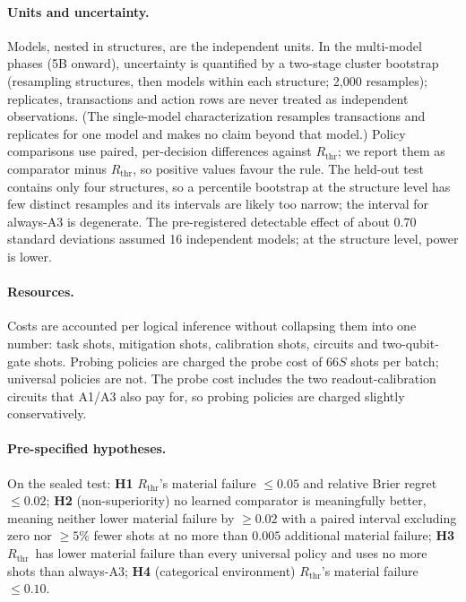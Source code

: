\documentclass[11pt]{article}
\newcommand{\Rthr}{$R_{\mathrm{thr}}$}
\begin{document}
\paragraph{Units and uncertainty.}
Models, nested in structures, are the independent units.
In the multi-model phases (5B onward), uncertainty is quantified by a two-stage cluster bootstrap (resampling structures, then models within each structure; 2{,}000 resamples); replicates, transactions and action rows are never treated as independent observations.
(The single-model characterization resamples transactions and replicates for one model and makes no claim beyond that model.)
Policy comparisons use paired, per-decision differences against \Rthr; we report them as comparator minus \Rthr, so positive values favour the rule.
The held-out test contains only four structures, so a percentile bootstrap at the structure level has few distinct resamples and its intervals are likely too narrow; the interval for always-A3 is degenerate.
The pre-registered detectable effect of about 0.70 standard deviations assumed 16 independent models; at the structure level, power is lower.

\paragraph{Resources.}
Costs are accounted per logical inference without collapsing them into one number: task shots, mitigation shots, calibration shots, circuits and two-qubit-gate shots.
Probing policies are charged the probe cost of $66S$ shots per batch; universal policies are not.
The probe cost includes the two readout-calibration circuits that A1/A3 also pay for, so probing policies are charged slightly conservatively.

\paragraph{Pre-specified hypotheses.}
On the sealed test: \textbf{H1} \Rthr's material failure $\le 0.05$ and relative Brier regret $\le 0.02$; \textbf{H2} (non-superiority) no learned comparator is meaningfully better, meaning neither lower material failure by $\ge0.02$ with a paired interval excluding zero nor $\ge5\%$ fewer shots at no more than $0.005$ additional material failure; \textbf{H3} \Rthr\ has lower material failure than every universal policy and uses no more shots than always-A3; \textbf{H4} (categorical environment) \Rthr's material failure $\le 0.10$.

\end{document}
